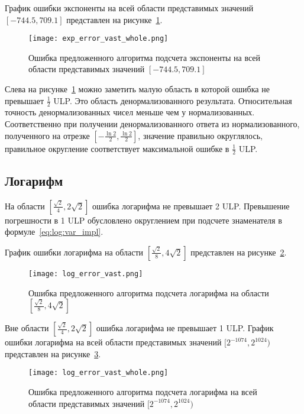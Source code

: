 График ошибки экспоненты на всей области представимых значений \newline $[-744.5, 709.1]$ представлен на рисунке~\ref{plot:exp:whole}.

\begin{figure}[hbt]
    \centering
    \texttt{[image: exp\_error\_vast\_whole.png]}
    \caption{Ошибка предложенного алгоритма подсчета экспоненты на всей области представимых значений $[-744.5, 709.1]$}
    \label{plot:exp:whole}
\end{figure}

Слева на рисунке~\ref{plot:exp:whole} можно заметить малую область в которой ошибка не превышает $\frac{1}{2}$ ULP.
Это область денормализованного результата.
Относительная точность денормализованных чисел меньше чем у нормализованных.
Соответственно при получении денормализованного ответа из нормализованного, полученного на отрезке $[-\frac{\ln{2}}{2}, \frac{\ln{2}}{2}]$, значение правильно округлялось, правильное округление соответствует максимальной ошибке в $\frac{1}{2}$ ULP.

\subsection{Логарифм}

На области $[\frac{\sqrt{2}}{4}, 2\sqrt{2}]$ ошибка логарифма не превышает 2 ULP.
Превышение погрешности в 1 ULP обусловлено округлением при подсчете знаменателя в формуле~\ref{eq:log:var_impl}.

График ошибки логарифма на области $[\frac{\sqrt{2}}{8}, 4\sqrt{2}]$ представлен на рисунке~\ref{plot:log:small}.

\begin{figure}[hbt]
    \centering
    \texttt{[image: log\_error\_vast.png]}
    \caption{Ошибка предложенного алгоритма подсчета логарифма на области $[\frac{\sqrt{2}}{8}, 4\sqrt{2}]$}
    \label{plot:log:small}
\end{figure}

Вне области $[\frac{\sqrt{2}}{4}, 2\sqrt{2}]$ ошибка логарифма не превышает 1 ULP.
График ошибки логарифма на всей области представимых значений $[2^{-1074}, 2^{1024})$ представлен на рисунке~\ref{plot:log:whole}.

\begin{figure}[hbt]
    \centering
    \texttt{[image: log\_error\_vast\_whole.png]}
    \caption{Ошибка предложенного алгоритма подсчета логарифма на всей области представимых значений $[2^{-1074}, 2^{1024})$}
    \label{plot:log:whole}
\end{figure}


